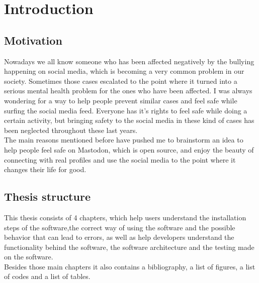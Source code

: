 \chapter{Introduction}
\label{ch:intro}

\section{Motivation}
Nowadays we all know someone who has been affected negatively
by the bullying happening on social media, which is becoming
a very common problem in our society. Sometimes those cases
escalated to the point where it turned into a serious mental
health problem for the ones who have been affected. I was
always wondering for a way to help people prevent similar
cases and feel safe while surfing the social media feed.
Everyone has it's rights to feel safe while doing a certain
activity, but bringing safety to the social media in these
kind of cases has been neglected throughout these last years.
\\[5pt]
The main reasons mentioned before have pushed me to brainstorm
an idea to help people feel safe on Mastodon, which is open source,
and enjoy the beauty of connecting with real profiles and use the
social media to the point where it changes their life for good.

\section{Thesis structure}
This thesis consists of 4 chapters, which help users understand the
installation steps of the software,the correct way of using the software
and the possible behavior that can lead to errors, as well as help developers
understand the functionality behind the software,
the software architecture and the testing made on the software.
\\[5pt]
Besides those main chapters it also contains a bibliography,
a list of figures, a list of codes and a list of tables.